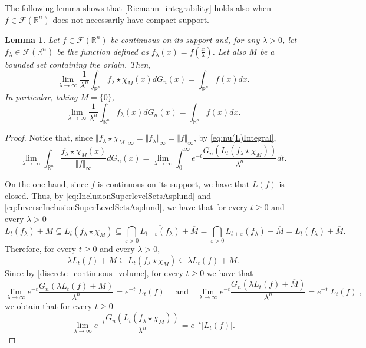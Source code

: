 \documentclass{amsart}
\newcommand{\R}{\mathbb R}
\newtheorem{lemma}{Lemma}[section]
\theoremstyle{remark}
\theoremstyle{definition}
\numberwithin{equation}{section}
\begin{document}
The following lemma shows that \eqref{Riemann_integrability} holds also when $f\in\mathcal{F}(\R^n)$ does not necessarily have compact support.
\begin{lemma}\label{lem:LogConcaveIntegralDiscreteToContinuous}
Let $f\in\mathcal{F}(\R^n)$ be continuous on its support and, for any $\lambda>0$, let  $f_\lambda\in\mathcal{F}(\R^n)$ be the function defined as $f_\lambda(x)= f\left(\frac{x}{\lambda}\right)$. Let also $M$ be a bounded set containing the origin. Then,
$$
\lim_{\lambda\to\infty}\frac{1}{\lambda^n}\int_{\R^n}f_\lambda\star\chi_{M}(x)dG_n(x)=\int_{\R^n}f(x)dx.
$$
In particular, taking $M=\{0\}$,
$$
\lim_{\lambda\to\infty}\frac{1}{\lambda^n}\int_{\R^n}f_\lambda(x)dG_n(x)=\int_{\R^n}f(x)dx.
$$
\end{lemma}

\begin{proof}
Notice that, since $\Vert f_\lambda\star\chi_M\Vert_\infty=\Vert f_\lambda\Vert_\infty=\Vert f\Vert_\infty$, by \eqref{eq:nu(L)Integral},
$$
\lim_{\lambda \to \infty} \int_{\R^n} \frac{f_\lambda\star\chi_M (x)}{\Vert f\Vert_\infty} dG_n(x)=\lim_{\lambda\to\infty}\int_0^\infty e^{-t} \frac{G_n (L_t (f_\lambda\star\chi_M))}{\lambda^n}dt.
$$

On the one hand, since $f$ is continuous on its support, we have that $L(f)$ is closed. Thus, by \eqref{eq:InclusionSuperlevelSetsAsplund} and \eqref{eq:InverseInclusionSuperLevelSetsAsplund}, we have that for every $t\geq0$ and every $\lambda>0$
$$
L_t(f_\lambda)+M\subseteq L_t(f_\lambda\star\chi_M)\subseteq\bigcap_{\varepsilon>0}\overline{L_{t+\varepsilon}(f_\lambda)}+\overline{M}=\bigcap_{\varepsilon>0}L_{t+\varepsilon}(f_\lambda)+\overline{M}=L_t(f_\lambda)+\overline{M}.
$$
Therefore, for every $t\geq0$ and every $\lambda>0$,
$$
\lambda L_t(f)+M\subseteq L_t(f_\lambda\star\chi_M)\subseteq \lambda L_t(f)+\overline{M}.
$$
Since by \eqref{discrete_continuous_volume}, for every $t\geq0$ we have that
$$
\lim_{\lambda\to\infty}e^{-t} \frac{G_n (\lambda L_t (f)+M)}{\lambda^n}=e^{-t} |L_t (f)|\quad\textrm{and}\quad\lim_{\lambda\to\infty}e^{-t} \frac{G_n (\lambda L_t (f)+\overline{M})}{\lambda^n}=e^{-t} |L_t (f)|,
$$
we obtain that for every $t\geq0$
$$
\lim_{\lambda\to\infty}e^{-t}\frac{G_n (L_t(f_\lambda\star\chi_M))}{\lambda^n}=e^{-t}|L_t(f)|.
$$



\end{proof}
\end{document}
